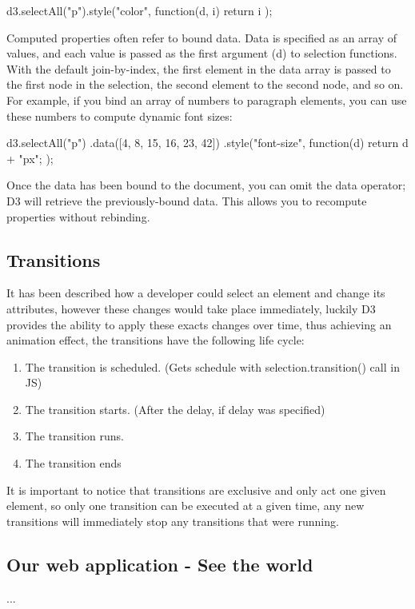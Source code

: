 \documentclass{bioinfo}
\begin{document}
d3.selectAll("p").style("color", function(d, i) {
  return i %
});

Computed properties often refer to bound data. Data is specified as an array of values, and each value is passed as the first argument (d) to selection functions. With the default join-by-index, the first element in the data array is passed to the first node in the selection, the second element to the second node, and so on. For example, if you bind an array of numbers to paragraph elements, you can use these numbers to compute dynamic font sizes:

d3.selectAll("p")
    .data([4, 8, 15, 16, 23, 42])
    .style("font-size", function(d) { return d + "px"; });

Once the data has been bound to the document, you can omit the data operator; D3 will retrieve the previously-bound data. This allows you to recompute properties without rebinding.


\subsection{Transitions} \label{s:transitions}
It has been described how a developer could select an element and change its attributes, however these changes would take place immediately, luckily D3 provides the ability to apply these exacts changes over time, thus achieving an animation effect, the transitions have the following life cycle:
\begin{enumerate}
\item The transition is scheduled. (Gets schedule with selection.transition() call in JS)
\item The transition starts. (After the delay, if delay was specified)
\item The transition runs.
\item The transition ends
\end{enumerate}
It is important to notice that transitions are exclusive and only act one given element, so only one transition can be executed at a given time, any new transitions will immediately stop any transitions that were running.

\subsection{Our web application - See the world}
...
\end{document}
